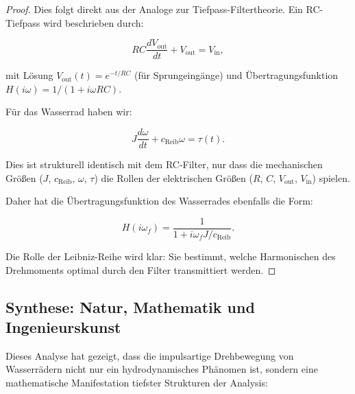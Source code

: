 \documentclass[a4paper,12pt]{article}
\theoremstyle{definition}
\begin{document}
\begin{proof}
  Dies folgt direkt aus der Analoge zur Tiefpass-Filtertheorie. Ein RC-Tiefpass wird beschrieben durch:
  
  \begin{equation}
    RC \frac{dV_{\text{out}}}{dt} + V_{\text{out}} = V_{\text{in}},
  \end{equation}
  
  mit Lösung $V_{\text{out}}(t) = e^{-t/RC}$ (für Sprungeingänge) und Übertragungsfunktion $H(i\omega) = 1/(1+i\omega RC)$.
  
  Für das Wasserrad haben wir:
  
  \begin{equation}
    J \frac{d\omega}{dt} + c_{\text{Reib}} \omega = \tau(t).
  \end{equation}
  
  Dies ist strukturell identisch mit dem RC-Filter, nur dass die mechanischen Größen ($J$, $c_{\text{Reib}}$, $\omega$, $\tau$) die Rollen der elektrischen Größen ($R$, $C$, $V_{\text{out}}$, $V_{\text{in}}$) spielen.
  
  Daher hat die Übertragungsfunktion des Wasserrades ebenfalls die Form:
  
  \begin{equation}
    H(i\omega_f) = \frac{1}{1 + i\omega_f J/c_{\text{Reib}}}.
  \end{equation}
  
  Die Rolle der Leibniz-Reihe wird klar: Sie bestimmt, welche Harmonischen des Drehmoments optimal durch den Filter transmittiert werden.
\end{proof}

\subsection{Synthese: Natur, Mathematik und Ingenieurskunst}

Dieses Analyse hat gezeigt, dass die impulsartige Drehbewegung von Wasserrädern nicht nur ein hydrodynamisches Phänomen ist, sondern eine mathematische Manifestation tiefster Strukturen der Analysis:
\end{document}
